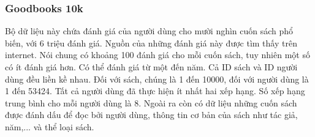 \subsubsection{Goodbooks 10k}
Bộ dữ liệu này chứa đánh giá của người dùng cho mười nghìn cuốn sách phổ biến, với 6 triệu đánh giá. Nguồn của những đánh giá này được tìm thấy trên internet. Nói chung có khoảng 100 đánh giá cho mỗi cuốn sách, tuy nhiên một số có ít đánh giá hơn. Có thể đánh giá từ một đến năm.
\newline Cả ID sách và ID người dùng đều liền kề nhau. Đối với sách, chúng là 1 đến 10000, đối với người dùng là 1 đến 53424. Tất cả người dùng đã thực hiện ít nhất hai xếp hạng. Số xếp hạng trung bình cho mỗi người dùng là 8.
\newline Ngoài ra còn có dữ liệu những cuốn sách được đánh dấu để đọc bởi người dùng, thông tin cơ bản của sách như tác giả, năm,... và thể loại sách.
